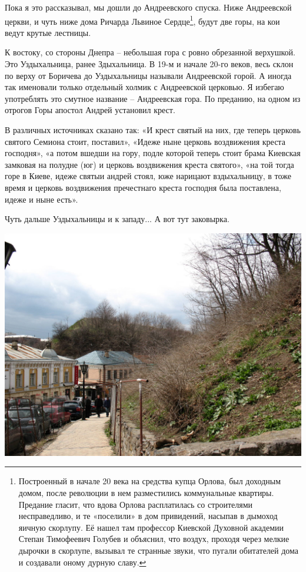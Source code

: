 Пока я это рассказывал, мы дошли до Андреевского спуска. Ниже Андреевской церкви, и чуть ниже дома Ричарда Львиное Сердце\footnote{Построенный в начале 20 века на средства купца Орлова, был доходным домом, после революции в нем разместились коммунальные квартиры. Предание гласит, что вдова Орлова расплатилась со строителями несправедливо, и те «поселили» в дом привидений, насыпав в дымоход яичную скорлупу. Её нашел там профессор Киевской Духовной академии Степан Тимофеевич Голубев и объяснил, что воздух, проходя через мелкие дырочки в скорлупе, вызывал те странные звуки, что пугали обитателей дома и создавали оному дурную славу.}, будут две горы, на кои ведут крутые лестницы.

К востоку, со стороны Днепра – небольшая гора с ровно обрезанной верхушкой. Это Уздыхальница, ранее Здыхальница. В 19-м и начале 20-го веков, весь склон по верху от Боричева до Уздыхальницы называли Андреевской горой. А иногда так именовали только отдельный холмик с Андреевской церковью. Я избегаю употреблять это смутное название – Андреевская гора. По преданию, на одном из отрогов Горы апостол Андрей установил крест.

В различных источниках сказано так: «И крест святый на них, где теперь церковь святого Семиона стоит, поставил», «Идеже ныне церковь воздвижения креста господня», «а потом вшедши на гору, подле которой теперь стоит брама Киевская замковая на полудне (юг) и церковь воздвижения креста святого», «на той тогда горе в Киеве, идеже святыи андрей стоял, юже нарицают вздыхальницу, в тоже время и церковь воздвижения пречестнаго креста господня была поставлена, идеже и ныне есть».

Чуть дальше Уздыхальницы и к западу... А вот тут заковырка.

\begin{center}
\includegraphics[width=\linewidth]{chast-colebanie-osnov/gora-zamkovaya-valovaya/s_IMG_1195.JPG}
\end{center}

